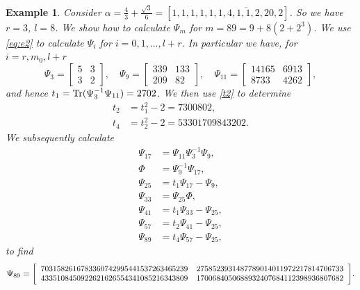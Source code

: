\documentclass[a4paper,fleqn]{cas-sc}
\def\Tr{{\rm Tr}}
\newtheorem{example}[theorem]{Example}
\begin{document}
\begin{example} \label{exa:ex1}
Consider
$\alpha=\frac{4}{3}+\frac{\sqrt{3}}{6}=[1, 1, 1, 1, \overline{1, 1, 4, 1, 1, 2, 20, 2}]$.
So we have $r=3$, $l=8$. We show how to calculate $\Psi_m$ for $m=89=9+8(2+2^3)$. We use \eqref{eq:e2} to calculate $\Psi_i$ for $i=0,1,\ldots,l+r$. In particular we have, for $i=r,m_0,l+r$
\[
\Psi_3=\left[\begin{array}{cc}
5 & 3 
\\
 3 & 2 
\end{array}\right], \quad
\Psi_9=\left[\begin{array}{cc}
339 & 133 
\\
 209 & 82 
\end{array}\right]
, \quad
\Psi_{11}=\left[\begin{array}{cc}
14165 & 6913 
\\
 8733 & 4262 
\end{array}\right],
\]
and hence $t_1=\Tr(\Psi_3^{-1}\Psi_{11})=2702$. We then use \eqref{t2} to determine
\begin{align*}
t_{2} &= t_1^2-2 = 7300802,\\
t_{4} &= t_2^2-2 = 53301709843202.
\end{align*}
We subsequently calculate
\begin{align*}
\Psi_{17}&=\Psi_{11}\Psi_3^{-1}\Psi_9,\\
\Phi&=\Psi_9^{-1}\Psi_{17},\\
\Psi_{25}&=t_1\Psi_{17}-\Psi_9,\\
\Psi_{33}&=\Psi_{25}\Phi,\\
\Psi_{41}&=t_1\Psi_{33}-\Psi_{25},\\
\Psi_{57}&=t_2\Psi_{41}-\Psi_{25},\\
\Psi_{89}&=t_4\Psi_{57}-\Psi_{25},
\end{align*}
to find
\[
\Psi_{89}={\small \left[\begin{array}{cc}
7031582616783360742995441537263465239 & 2758523931487789014011972217814706733 
\\
 4335108450922621626554341085216343809 & 1700684050688932407684112398936807682 
\end{array}\right]}.
\]
\end{example}
\end{document}
